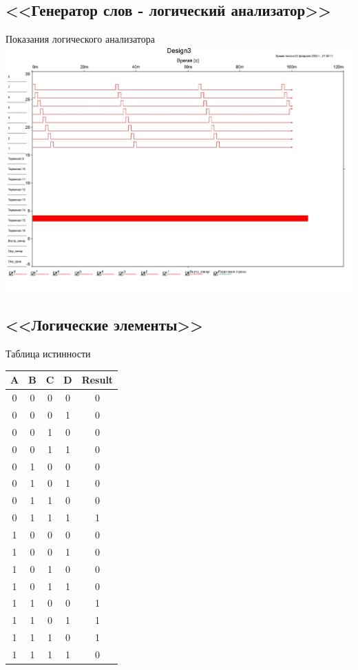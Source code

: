 \documentclass[11pt]{article}
\begin{document}
\subsection{<<Генератор слов - логический анализатор>>}
\begin{center}
    Показания логического анализатора
    \includegraphics[width=1\linewidth]{3/graph.jpg}
\end{center}
\subsection{<<Логические элементы>>}
\begin{center}
    Таблица истинности
    \begin{table}[h!]
        \centering
        \begin{tabular}{|c|c|c|c|c|}
            \hline
            A & B & C & D & Result \\ \hline
            0 & 0 & 0 & 0 & 0      \\ \hline
            0 & 0 & 0 & 1 & 0      \\ \hline
            0 & 0 & 1 & 0 & 0      \\ \hline
            0 & 0 & 1 & 1 & 0      \\ \hline
            0 & 1 & 0 & 0 & 0      \\ \hline
            0 & 1 & 0 & 1 & 0      \\ \hline
            0 & 1 & 1 & 0 & 0      \\ \hline
            0 & 1 & 1 & 1 & 1      \\ \hline
            1 & 0 & 0 & 0 & 0      \\ \hline
            1 & 0 & 0 & 1 & 0      \\ \hline
            1 & 0 & 1 & 0 & 0      \\ \hline
            1 & 0 & 1 & 1 & 0      \\ \hline
            1 & 1 & 0 & 0 & 1      \\ \hline
            1 & 1 & 0 & 1 & 1      \\ \hline
            1 & 1 & 1 & 0 & 1      \\ \hline
            1 & 1 & 1 & 1 & 0      \\ \hline
        \end{tabular}
    \end{table}
\end{center}
\end{document}
